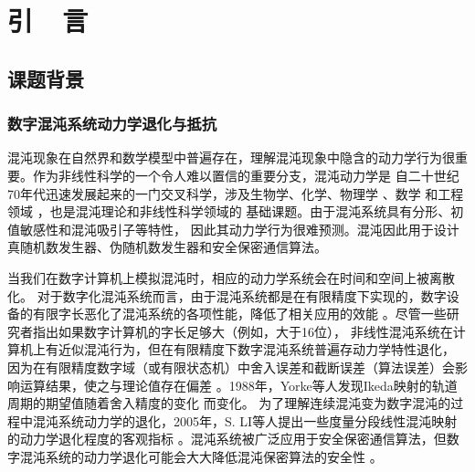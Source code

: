 ﻿
\chapter{引~~言}\label{chap:introduction}


\section{课题背景}

\subsection{数字混沌系统动力学退化与抵抗}

混沌现象在自然界和数学模型中普遍存在，理解混沌现象中隐含的动力学行为很重要。作为非线性科学的一个令人难以置信的重要分支，混沌动力学是
自二十世纪70年代迅速发展起来的一门交叉科学，涉及生物学、化学、物理学
、数学
和工程领域
，也是混沌理论和非线性科学领域的
基础课题。由于混沌系统具有分形、初值敏感性和混沌吸引子等特性，
因此其动力学行为很难预测。混沌因此用于设计真随机数发生器、伪随机数发生器和安全保密通信算法。

当我们在数字计算机上模拟混沌时，相应的动力学系统会在时间和空间上被离散化。
对于数字化混沌系统而言，由于混沌系统都是在有限精度下实现的，数字设备的有限字长恶化了混沌系统的各项性能，降低了相关应用的效能
。尽管一些研究者指出如果数字计算机的字长足够大（例如，大于16位），
非线性混沌系统在计算机上有近似混沌行为，但在有限精度下数字混沌系统普遍存动力学特性退化，
因为在有限精度数字域（或有限状态机）中舍入误差和截断误差（算法误差）会影响运算结果，使之与理论值存在偏差
。1988年，Yorke等人发现Ikeda映射的轨道周期的期望值随着舍入精度的变化
而变化。
为了理解连续混沌变为数字混沌的过程中混沌系统动力学的退化，2005年，S. LI等人提出一些度量分段线性混沌映射的动力学退化程度的客观指标
。混沌系统被广泛应用于安全保密通信算法，但数字混沌系统的动力学退化可能会大大降低混沌保密算法的安全性
。

